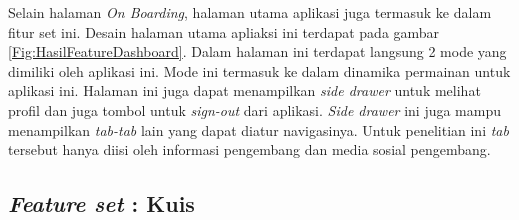 Selain halaman \textit{On Boarding}, halaman utama aplikasi juga termasuk ke dalam fitur set ini. Desain halaman utama apliaksi ini terdapat pada gambar \ref*{Fig:HasilFeatureDashboard}.
Dalam halaman ini terdapat langsung 2 mode yang dimiliki oleh aplikasi ini. Mode ini termasuk ke dalam dinamika permainan untuk aplikasi ini.
Halaman ini juga dapat menampilkan \textit{side drawer} untuk melihat profil dan juga tombol untuk \textit{sign-out} dari aplikasi.
\textit{Side drawer} ini juga mampu menampilkan \textit{tab-tab} lain yang dapat diatur navigasinya. Untuk penelitian ini \textit{tab} tersebut hanya diisi oleh informasi pengembang dan media sosial pengembang. 
\subsection{\textit{Feature set} : Kuis}
